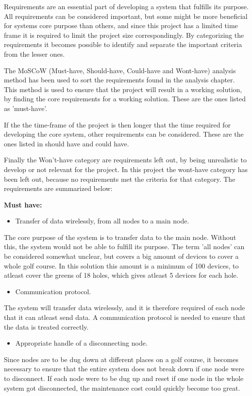 Requirements are an essential part of developing a system that fulfills its purpose. All requirements can be considered important, but some might be more beneficial for systems core purpose than others, and since this project has a limited time frame it is required to limit the project size correspondingly. By categorizing the requirements it becomes possible to identify and separate the important criteria from the lesser ones.

The MoSCoW (Must-have, Should-have, Could-have and Wont-have) analysis method has been used to sort the requirements found in the analysis chapter. This method is used to ensure that the project will result in a working solution, by finding the core requirements for a working solution. These are the ones listed as 'must-have'.

If the the time-frame of the project is then longer that the time required for developing the core system, other requirements can be considered. These are the ones listed in should have and could have. 

Finally the Won't-have category are requirements left out, by being unrealistic to develop or not relevant for the project. In this project the wont-have category has been left out, because no requirements met the criteria for that category. The requirements are summarized below:

\textbf{Must have:}
\begin{itemize}
\item Transfer of data wirelessly, from all nodes to a main node.
\end{itemize}
The core purpose of the system is to transfer data to the main node. Without this, the system would not be able to fulfill its purpose. The term 'all nodes' can be considered somewhat unclear, but covers a big amount of devices to cover a whole golf course. In this solution this amount is a minimum of 100 devices, to atleast cover the greens of 18 holes, which gives atleast 5 devices for each hole. 


\begin{itemize}
\item Communication protocol.
\end{itemize}
The system will transfer data wirelessly, and it is therefore required of each node that it can atleast send data. A communication protocol is needed to ensure that the data is treated correctly.


\begin{itemize}
\item Appropriate handle of a disconnecting node.
\end{itemize}
Since nodes are to be dug down at different places on a golf course, it becomes necessary to ensure that the entire system does not break down if one node were to disconnect. If each node were to be dug up and reset if one node in the whole system got disconnected, the maintenance cost could quickly become too great.


